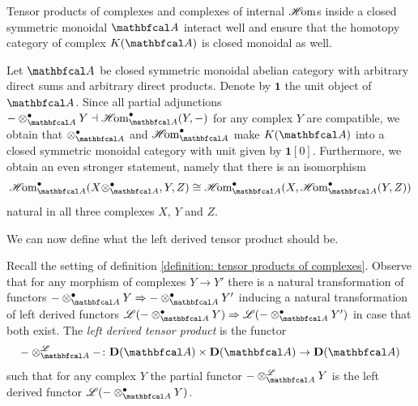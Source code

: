 Tensor products of complexes and complexes of internal ${\operatorname{\mathscr{H}\!om}}$s inside a closed symmetric monoidal $\category{A}$ interact well and ensure that the homotopy category of complex $\homotopyCategoryOfComplexes{\category{A}}$ is closed monoidal as well.
\begin{remark}
	\label{definition: chain complexes are closed monoidal}
	
	Let $\category A$ be closed symmetric monoidal abelian category with arbitrary direct sums and arbitrary direct products. Denote by $\mathbf{1}$ the unit object of $\category{A}$. Since all partial adjunctions $-\otimes_\category{A}^\bullet Y \ladj \intHom_\category{A}^\bullet(Y, -)$ for any complex $Y$ are compatible, we obtain that $\otimes_\category{A}^\bullet$ and $\intHom_\category{A}^\bullet$ make $\homotopyCategoryOfComplexes{\category{A}}$ into a closed symmetric monoidal category with unit given by $\mathbf{1}[0]$. Furthermore, we obtain an even stronger statement, namely that there is an isomorphism
	$$\intHom_\category{A}^\bullet(X \otimes_\category{A}^\bullet, Y, Z) \cong \intHom_\category{A}^\bullet(X, \intHom_\category{A}^\bullet(Y, Z))$$
	natural in all three complexes $X$, $Y$ and $Z$.
\end{remark}

We can now define what the left derived tensor product should be.
\begin{definition}
	\label{definition: left derived tensor products}
	
	Recall the setting of definition \ref{definition: tensor products of complexes}. Observe that for any morphism of complexes $Y\to Y'$ there is a natural transformation of functors $-\otimes_\category{A}^\bullet Y \Rightarrow -\otimes_\category{A}^\bullet Y'$ inducing a natural transformation of left derived functors $\LeftD(-\otimes_\category{A}^\bullet Y) \Rightarrow \LeftD(-\otimes_\category{A}^\bullet Y')$ in case that both exist. The \emph{left derived tensor product} is the functor
	$$-\Dotimes_\category{A} - \colon \derived{\category{A}} \times \derived{\category{A}} \to \derived{\category{A}}$$
	such that for any complex $Y$ the partial functor $-\Dotimes_\category{A} Y$ is the left derived functor $\LeftD(-\otimes_\category{A}^\bullet Y)$.
\end{definition}

